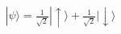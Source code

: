 \documentclass[preview]{standalone}
\begin{document}
\begin{align*}
|\psi\rangle = \frac{1}{\sqrt{2}}|\uparrow\rangle + \frac{1}{\sqrt{2}}|\downarrow\rangle
\end{align*}
\end{document}
